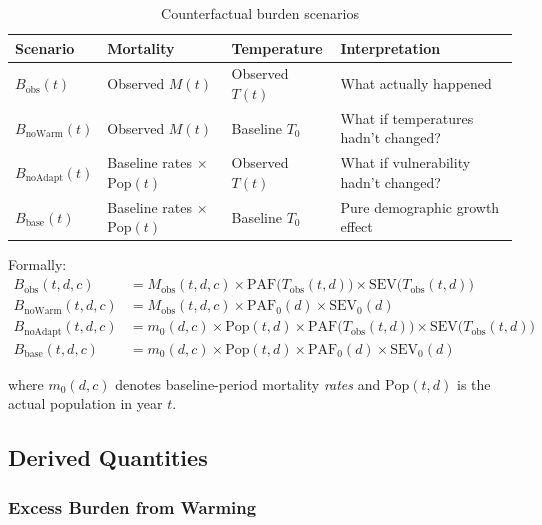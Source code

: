 \documentclass[11pt,a4paper]{article}
\begin{document}
\begin{table}[H]
\centering
\small
\caption{Counterfactual burden scenarios}
\label{tab:scenarios}
\begin{tabular}{@{}llll@{}}
\toprule
\textbf{Scenario} & \textbf{Mortality} & \textbf{Temperature} & \textbf{Interpretation} \\
\midrule
$B_{\text{obs}}(t)$ & Observed $M(t)$ & Observed $T(t)$ & What actually happened \\[0.3em]
$B_{\text{noWarm}}(t)$ & Observed $M(t)$ & Baseline $T_0$ & What if temperatures hadn't changed? \\[0.3em]
$B_{\text{noAdapt}}(t)$ & Baseline rates $\times$ $\text{Pop}(t)$ & Observed $T(t)$ & What if vulnerability hadn't changed? \\[0.3em]
$B_{\text{base}}(t)$ & Baseline rates $\times$ $\text{Pop}(t)$ & Baseline $T_0$ & Pure demographic growth effect \\
\bottomrule
\end{tabular}
\end{table}

\medskip

Formally:
\begin{align}
  B_{\text{obs}}(t,d,c) &= M_{\text{obs}}(t,d,c) \times \text{PAF}\bigl(T_{\text{obs}}(t,d)\bigr) \times \text{SEV}\bigl(T_{\text{obs}}(t,d)\bigr) \label{eq:obs}\\[0.5em]
  B_{\text{noWarm}}(t,d,c) &= M_{\text{obs}}(t,d,c) \times \text{PAF}_0(d) \times \text{SEV}_0(d) \label{eq:nowarm}\\[0.5em]
  B_{\text{noAdapt}}(t,d,c) &= m_0(d,c) \times \text{Pop}(t,d) \times \text{PAF}\bigl(T_{\text{obs}}(t,d)\bigr) \times \text{SEV}\bigl(T_{\text{obs}}(t,d)\bigr) \label{eq:noadapt}\\[0.5em]
  B_{\text{base}}(t,d,c) &= m_0(d,c) \times \text{Pop}(t,d) \times \text{PAF}_0(d) \times \text{SEV}_0(d) \label{eq:base}
\end{align}

where $m_0(d,c)$ denotes baseline-period mortality \emph{rates} and $\text{Pop}(t,d)$ is the actual population in year $t$.

\subsection{Derived Quantities}

\subsubsection{Excess Burden from Warming}
\end{document}
